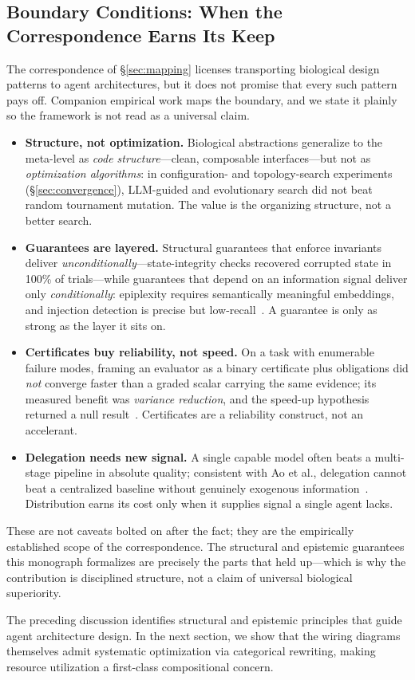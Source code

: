 \subsection{Boundary Conditions: When the Correspondence Earns Its Keep}

The correspondence of \S\ref{sec:mapping} licenses transporting biological design patterns to agent
architectures, but it does not promise that every such pattern pays off. Companion empirical work maps the
boundary, and we state it plainly so the framework is not read as a universal claim.

\begin{itemize}[leftmargin=*]
\item \textbf{Structure, not optimization.} Biological abstractions generalize to the meta-level as \emph{code
structure}---clean, composable interfaces---but not as \emph{optimization algorithms}: in configuration- and
topology-search experiments (\S\ref{sec:convergence}), LLM-guided and evolutionary search did not beat random
tournament mutation. The value is the organizing structure, not a better search.
\item \textbf{Guarantees are layered.} Structural guarantees that enforce invariants deliver
\emph{unconditionally}---state-integrity checks recovered corrupted state in 100\% of trials---while guarantees
that depend on an information signal deliver only \emph{conditionally}: epiplexity requires semantically
meaningful embeddings, and injection detection is precise but low-recall~\cite{banu2026benchmarks}. A guarantee
is only as strong as the layer it sits on.
\item \textbf{Certificates buy reliability, not speed.} On a task with enumerable failure modes, framing an
evaluator as a binary certificate plus obligations did \emph{not} converge faster than a graded scalar carrying
the same evidence; its measured benefit was \emph{variance reduction}, and the speed-up hypothesis returned a
null result~\cite{banu2026reflective}. Certificates are a reliability construct, not an accelerant.
\item \textbf{Delegation needs new signal.} A single capable model often beats a multi-stage pipeline in
absolute quality; consistent with Ao et al., delegation cannot beat a centralized baseline without genuinely
exogenous information~\cite{banu2026benchmarks}. Distribution earns its cost only when it supplies signal a
single agent lacks.
\end{itemize}

These are not caveats bolted on after the fact; they are the empirically established scope of the
correspondence. The structural and epistemic guarantees this monograph formalizes are precisely the parts that
held up---which is why the contribution is disciplined structure, not a claim of universal biological
superiority.

The preceding discussion identifies structural and epistemic principles that guide agent architecture design. In the next section, we show that the wiring diagrams themselves admit systematic optimization via categorical rewriting, making resource utilization a first-class compositional concern.

